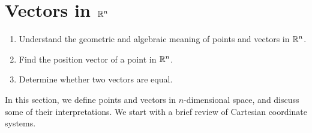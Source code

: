 \section{Vectors in $\mathbb{R}^n$}

\begin{outcome}
  \begin{enumerate}
  \item Understand the geometric and algebraic meaning of points and
    vectors in $\mathbb{R}^n$.
  \item Find the position vector of a point in $\mathbb{R}^n$.
  \item Determine whether two vectors are equal.
  \end{enumerate}
\end{outcome}

In this section, we define points and vectors in $n$-dimensional
space, and discuss some of their interpretations. We start with a
brief review of Cartesian coordinate systems.
\bigskip

